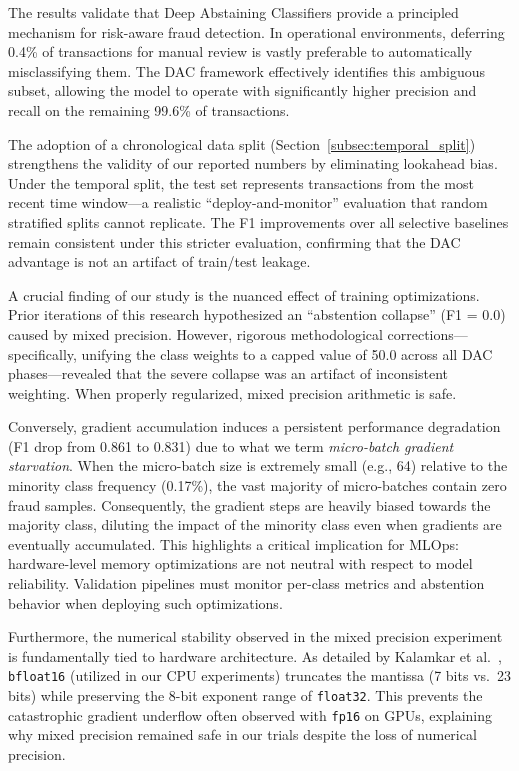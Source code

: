 \documentclass[12pt,a4paper]{article}
\begin{document}
The results validate that Deep Abstaining Classifiers provide a principled
mechanism for risk-aware fraud detection. In operational environments, deferring
0.4\% of transactions for manual review is vastly preferable to automatically
misclassifying them. The DAC framework effectively identifies this ambiguous
subset, allowing the model to operate with significantly higher precision and
recall on the remaining 99.6\% of transactions.

The adoption of a chronological data split (Section~\ref{subsec:temporal_split})
strengthens the validity of our reported numbers by eliminating lookahead bias.
Under the temporal split, the test set represents transactions from the most
recent time window---a realistic ``deploy-and-monitor'' evaluation that random
stratified splits cannot replicate. The F1 improvements over all selective
baselines remain consistent under this stricter evaluation, confirming that the
DAC advantage is not an artifact of train/test leakage.

A crucial finding of our study is the nuanced effect of training optimizations.
Prior iterations of this research hypothesized an ``abstention collapse'' (F1 =
0.0) caused by mixed precision. However, rigorous methodological
corrections---specifically, unifying the class weights to a capped value of 50.0
across all DAC phases---revealed that the severe collapse was an artifact of
inconsistent weighting. When properly regularized, mixed precision arithmetic is
safe.

Conversely, gradient accumulation induces a persistent performance degradation
(F1 drop from 0.861 to 0.831) due to what we term \textit{micro-batch gradient
starvation}. When the micro-batch size is extremely small (e.g., 64) relative to
the minority class frequency (0.17\%), the vast majority of micro-batches contain
zero fraud samples. Consequently, the gradient steps are heavily biased towards
the majority class, diluting the impact of the minority class even when gradients
are eventually accumulated. This highlights a critical implication for MLOps:
hardware-level memory optimizations are not neutral with respect to model
reliability. Validation pipelines must monitor per-class metrics and abstention
behavior when deploying such optimizations.

Furthermore, the numerical stability observed in the mixed precision experiment
is fundamentally tied to hardware architecture. As detailed by Kalamkar et
al.~\cite{b29}, \texttt{bfloat16} (utilized in our CPU experiments) truncates
the mantissa (7 bits vs.\ 23 bits) while preserving the 8-bit exponent range of
\texttt{float32}. This prevents the catastrophic gradient underflow often
observed with \texttt{fp16} on GPUs, explaining why mixed precision remained
safe in our trials despite the loss of numerical precision.
\end{document}
